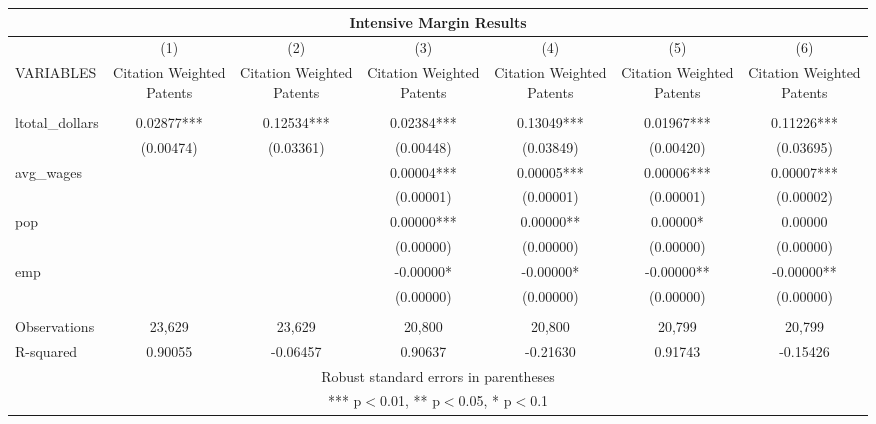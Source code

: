 \documentclass[]{article}
\begin{document}
\begin{tabular}{lcccccc}
\multicolumn{7}{c}{Intensive Margin Results} \\ \hline
 & (1) & (2) & (3) & (4) & (5) & (6) \\
VARIABLES & Citation Weighted Patents & Citation Weighted Patents & Citation Weighted Patents & Citation Weighted Patents & Citation Weighted Patents & Citation Weighted Patents \\ \hline
 &  &  &  &  &  &  \\
ltotal\_dollars & 0.02877*** & 0.12534*** & 0.02384*** & 0.13049*** & 0.01967*** & 0.11226*** \\
 & (0.00474) & (0.03361) & (0.00448) & (0.03849) & (0.00420) & (0.03695) \\
avg\_wages &  &  & 0.00004*** & 0.00005*** & 0.00006*** & 0.00007*** \\
 &  &  & (0.00001) & (0.00001) & (0.00001) & (0.00002) \\
pop &  &  & 0.00000*** & 0.00000** & 0.00000* & 0.00000 \\
 &  &  & (0.00000) & (0.00000) & (0.00000) & (0.00000) \\
emp &  &  & -0.00000* & -0.00000* & -0.00000** & -0.00000** \\
 &  &  & (0.00000) & (0.00000) & (0.00000) & (0.00000) \\
 &  &  &  &  &  &  \\
Observations & 23,629 & 23,629 & 20,800 & 20,800 & 20,799 & 20,799 \\
 R-squared & 0.90055 & -0.06457 & 0.90637 & -0.21630 & 0.91743 & -0.15426 \\ \hline
\multicolumn{7}{c}{ Robust standard errors in parentheses} \\
\multicolumn{7}{c}{ *** p$<$0.01, ** p$<$0.05, * p$<$0.1} \\
\end{tabular}
\end{document}
